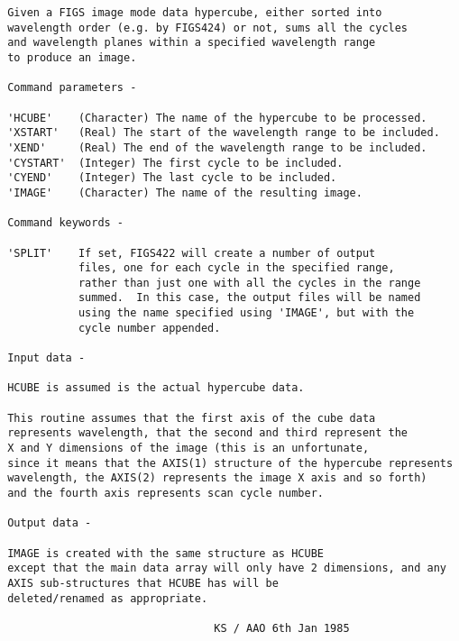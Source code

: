 \begin{description}
\begin{verbatim}
 Given a FIGS image mode data hypercube, either sorted into
 wavelength order (e.g. by FIGS424) or not, sums all the cycles
 and wavelength planes within a specified wavelength range
 to produce an image.

 Command parameters -

 'HCUBE'    (Character) The name of the hypercube to be processed.
 'XSTART'   (Real) The start of the wavelength range to be included.
 'XEND'     (Real) The end of the wavelength range to be included.
 'CYSTART'  (Integer) The first cycle to be included.
 'CYEND'    (Integer) The last cycle to be included.
 'IMAGE'    (Character) The name of the resulting image.

 Command keywords -

 'SPLIT'    If set, FIGS422 will create a number of output
            files, one for each cycle in the specified range,
            rather than just one with all the cycles in the range
            summed.  In this case, the output files will be named
            using the name specified using 'IMAGE', but with the
            cycle number appended.

 Input data -

 HCUBE is assumed is the actual hypercube data.

 This routine assumes that the first axis of the cube data
 represents wavelength, that the second and third represent the
 X and Y dimensions of the image (this is an unfortunate,
 since it means that the AXIS(1) structure of the hypercube represents
 wavelength, the AXIS(2) represents the image X axis and so forth)
 and the fourth axis represents scan cycle number.

 Output data -

 IMAGE is created with the same structure as HCUBE
 except that the main data array will only have 2 dimensions, and any
 AXIS sub-structures that HCUBE has will be
 deleted/renamed as appropriate.

                                 KS / AAO 6th Jan 1985
\end{verbatim}
\end{description}

